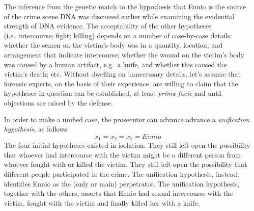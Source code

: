 \documentclass[10pt]{article}
\begin{document}

\noindent
The inference from the genetic match to the hypothesis that Ennio is the 
source of the crime scene DNA was discussed earlier while examining 
the evidential strength of DNA evidence.
The acceptability of the other hypotheses
(i.e.\ intercourse; fight; killing) depends on a number 
of case-by-case details: whether the semen on the victim's body was in a quantity, location, 
and arrangement that indicate intercourse; whether the wound on the victim's body was caused by a human artifact, e.g.\ a knife, and whether this caused 
the victim's death; etc. Without dwelling on unnecessary details, let's assume 
that forensic experts, on the basis of their experience, are willing to claim that 
the hypotheses in question can be established, at least \textit{prima facie}  and until 
objections are raised by the defense. 

In order to make a unified case, the prosecutor can advance advance 
a \textit{unification hypothesis}, as follows:
%
\[ x_1=x_2=x_3=\textit{Ennio}\]
%
\noindent
The four initial hypotheses existed in isolation. They still left open the possibility that whoever had intercourse with the victim might be a different person 
from whoever fought with or killed the victim.  They still left open the possibility that different people participated in the crime. 
The unification hypothesis, instead, identifies Ennio as the (only or main) perpetrator. The unification hypothesis, together with the others, asserts that Ennio 
had sexual intercourse with the victim, fought with the victim and finally killed her with a knife. 
\end{document}
